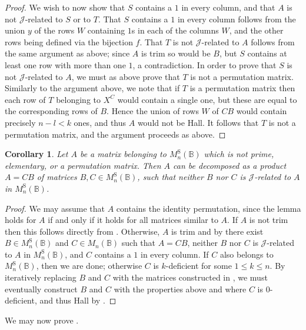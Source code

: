 \documentclass[11pt]{article}
\newtheorem{cor}[thm]{Corollary}
\numberwithin{equation}{section}
\newcommand{\B}{\mathbb{B}}
\newcommand{\Bn}{M_n(\B)}
\newcommand{\Halln}{M_n^{\text{S}}(\B)}
\newcommand{\J}{\mathscr{J}}
\begin{document}
\begin{proof}
  We wish to now show that $S$ contains a $1$ in every column, and that $A$ is
  not $\J$-related to $S$ or to $T$. That $S$ contains a $1$ in every column
  follows from the union $y$ of the rows $W$ containing $1$s in each of the columns
  $W$, and the other rows being defined via the bijection $f$. That
  $T$ is not $\J$-related to $A$ follows from the same argument as above; since
  $A$ is trim so would be $B$, but $S$ contains at least one row with more than
  one $1$, a contradiction. In order to prove that $S$ is not $\J$-related to
  $A$, we must as above prove that $T$ is not a permutation matrix. Similarly to
  the argument above, we note that if $T$ is a permutation matrix then each row
  of $T$ belonging to $X^C$ would contain a single one, but these are equal to the
  corresponding rows of $B$. Hence the union of rows $W$ of $CB$ would contain
  precisely $n - l < k$ ones, and thus $A$ would not be Hall. It follows that
  $T$ is not a permutation matrix, and the argument proceeds as above. 
\end{proof}

\begin{cor}
  Let $A$ be a matrix belonging to $\Halln$ which is not prime, elementary,
  or a permutation matrix. Then $A$ can be decomposed as a product $A = CB$
  of matrices $B, C \in \Halln$, such that neither $B$ nor $C$ is $\J$-related
  to $A$ in $\Halln$.
\end{cor}
\begin{proof}
  We may assume that $A$ contains the identity permutation, since the lemma
  holds for $A$ if and only if it holds for all matrices similar to $A$. If $A$
  is not trim then this follows directly from .
  Otherwise, $A$ is trim and by  there exist $B \in
  \Halln$ and $C \in \Bn$ such that $A = CB$, neither $B$ nor $C$ is
  $\J$-related to $A$ in $\Halln$, and $C$ contains a $1$ in every column. If
  $C$ also belongs to $\Halln$, then we are done; otherwise $C$ is $k$-deficient
  for some $1 \leq k \leq n$. By iteratively replacing $B$ and $C$ with the
  matrices constructed in , we must eventually
  construct $B$ and $C$ with the properties above and where $C$ is
  $0$-deficient, and thus Hall by .
\end{proof}

We may now prove .
\end{document}
